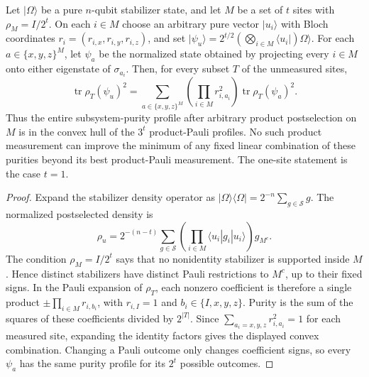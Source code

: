 \begin{proposition}
\label{prop:pauliprojection}
Let $|\Omega\rangle$ be a pure $n$-qubit stabilizer state, and let
$M$ be a set of $t$ sites with $\rho_M=I/2^t$. On each $i\in M$ choose
an arbitrary pure vector $|u_i\rangle$ with Bloch coordinates
$r_i=(r_{i,x},r_{i,y},r_{i,z})$, and set
$|\psi_u\rangle=2^{t/2}(\bigotimes_{i\in M}\langle u_i|)\Omega\rangle$.
For each $a\in\{x,y,z\}^M$, let $\psi_a$ be the normalized state
obtained by projecting every $i\in M$ onto either eigenstate of
$\sigma_{a_i}$. Then, for every subset $T$ of the unmeasured sites,
\[
 \operatorname{tr}\rho_T(\psi_u)^2
  =\sum_{a\in\{x,y,z\}^M}
      \left(\prod_{i\in M}r_{i,a_i}^2\right)
      \operatorname{tr}\rho_T(\psi_a)^2.
\]
Thus the entire subsystem-purity profile after arbitrary product
postselection on $M$ is in the convex hull of the $3^t$ product-Pauli
profiles. No such product measurement can improve the minimum of any
fixed linear combination of these purities beyond its best product-Pauli
measurement. The one-site statement is the case $t=1$.
\end{proposition}
\begin{proof}
Expand the stabilizer density operator as
$|\Omega\rangle\langle\Omega|=2^{-n}\sum_{g\in\mathcal S}g$.
The normalized postselected density is
\[
 \rho_u=2^{-(n-t)}\sum_{g\in\mathcal S}
       \left(\prod_{i\in M}\langle u_i|g_i|u_i\rangle\right)g_{M^c}.
\]
The condition $\rho_M=I/2^t$ says that no nonidentity stabilizer is
supported inside $M$. Hence distinct stabilizers have distinct Pauli
restrictions to $M^c$, up to their fixed signs. In the Pauli expansion
of $\rho_T$, each nonzero coefficient is therefore a single product
$\pm\prod_{i\in M}r_{i,b_i}$, with $r_{i,I}=1$ and
$b_i\in\{I,x,y,z\}$. Purity is the sum of the squares of these
coefficients divided by $2^{|T|}$. Since
$\sum_{a_i=x,y,z}r_{i,a_i}^2=1$ for each measured site, expanding the
identity factors gives the displayed convex combination. Changing a
Pauli outcome only changes coefficient signs, so every $\psi_a$ has
the same purity profile for its $2^t$ possible outcomes.
\end{proof}
